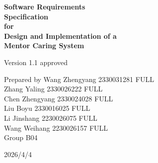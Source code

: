 \begin{titlepage}
\centering
\vspace*{3cm}

{\LARGE\bfseries Software Requirements\\Specification\\[0.3cm]for\\[0.3cm]Design and Implementation of a\\Mentor Caring System\\[1cm]}

{\large Version 1.1 approved}

\vspace{2cm}

{\large
Prepared by Wang Zhengyang 2330031281 FULL\\
Zhang Yaling 2330026222 FULL\\
Chen Zhengyang 2330024028 FULL\\
Liu Boyu 2330016025 FULL\\
Li Jinshang 2230026075 FULL\\
Wang Weihang 2230026157 FULL\\[1cm]
Group B04
}

\vspace{2cm}

{\large 2026/4/4}
\end{titlepage}
